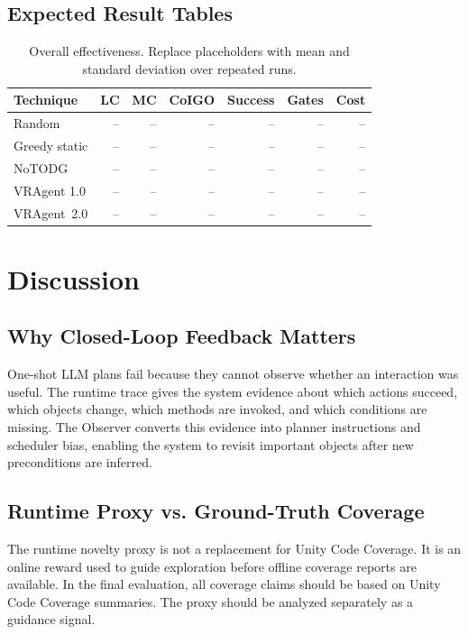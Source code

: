 \documentclass[10pt,conference]{IEEEtran}
\newcommand{\tool}{VRAgent~2.0}
\begin{document}
\subsection{Expected Result Tables}

\begin{table}[t]
\centering
\caption{Overall effectiveness. Replace placeholders with mean and standard
deviation over repeated runs.}
\label{tab:results}
\begin{tabular}{lrrrrrr}
\toprule
Technique & LC & MC & CoIGO & Success & Gates & Cost \\
\midrule
Random & -- & -- & -- & -- & -- & -- \\
Greedy static & -- & -- & -- & -- & -- & -- \\
NoTODG & -- & -- & -- & -- & -- & -- \\
VRAgent 1.0 & -- & -- & -- & -- & -- & -- \\
\tool & -- & -- & -- & -- & -- & -- \\
\bottomrule
\end{tabular}
\end{table}

\section{Discussion}

\subsection{Why Closed-Loop Feedback Matters}

One-shot LLM plans fail because they cannot observe whether an interaction was
useful. The runtime trace gives the system evidence about which actions succeed,
which objects change, which methods are invoked, and which conditions are
missing. The Observer converts this evidence into planner instructions and
scheduler bias, enabling the system to revisit important objects after new
preconditions are inferred.

\subsection{Runtime Proxy vs. Ground-Truth Coverage}

The runtime novelty proxy is not a replacement for Unity Code Coverage. It is an
online reward used to guide exploration before offline coverage reports are
available. In the final evaluation, all coverage claims should be based on Unity
Code Coverage summaries. The proxy should be analyzed separately as a guidance
signal.
\end{document}
